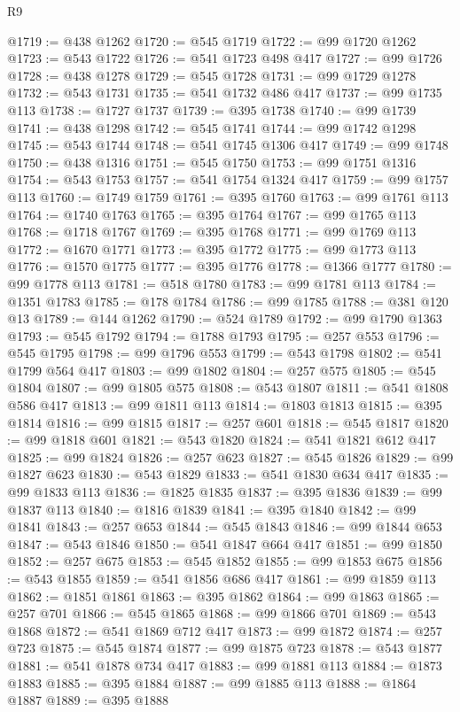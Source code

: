 \begin{lexlean}{R9}
\begin{coremodule}
@1719 := @438 @1262
@1720 := @545 @1719
@1722 := @99 @1720 @1262
@1723 := @543 @1722
@1726 := @541 @1723 @498 @417
@1727 := @99 @1726
@1728 := @438 @1278
@1729 := @545 @1728
@1731 := @99 @1729 @1278
@1732 := @543 @1731
@1735 := @541 @1732 @486 @417
@1737 := @99 @1735 @113
@1738 := @1727 @1737
@1739 := @395 @1738
@1740 := @99 @1739
@1741 := @438 @1298
@1742 := @545 @1741
@1744 := @99 @1742 @1298
@1745 := @543 @1744
@1748 := @541 @1745 @1306 @417
@1749 := @99 @1748
@1750 := @438 @1316
@1751 := @545 @1750
@1753 := @99 @1751 @1316
@1754 := @543 @1753
@1757 := @541 @1754 @1324 @417
@1759 := @99 @1757 @113
@1760 := @1749 @1759
@1761 := @395 @1760
@1763 := @99 @1761 @113
@1764 := @1740 @1763
@1765 := @395 @1764
@1767 := @99 @1765 @113
@1768 := @1718 @1767
@1769 := @395 @1768
@1771 := @99 @1769 @113
@1772 := @1670 @1771
@1773 := @395 @1772
@1775 := @99 @1773 @113
@1776 := @1570 @1775
@1777 := @395 @1776
@1778 := @1366 @1777
@1780 := @99 @1778 @113
@1781 := @518 @1780
@1783 := @99 @1781 @113
@1784 := @1351 @1783
@1785 := @178 @1784
@1786 := @99 @1785
@1788 := @381 @120 @13
@1789 := @144 @1262
@1790 := @524 @1789
@1792 := @99 @1790 @1363
@1793 := @545 @1792
@1794 := @1788 @1793
@1795 := @257 @553
@1796 := @545 @1795
@1798 := @99 @1796 @553
@1799 := @543 @1798
@1802 := @541 @1799 @564 @417
@1803 := @99 @1802
@1804 := @257 @575
@1805 := @545 @1804
@1807 := @99 @1805 @575
@1808 := @543 @1807
@1811 := @541 @1808 @586 @417
@1813 := @99 @1811 @113
@1814 := @1803 @1813
@1815 := @395 @1814
@1816 := @99 @1815
@1817 := @257 @601
@1818 := @545 @1817
@1820 := @99 @1818 @601
@1821 := @543 @1820
@1824 := @541 @1821 @612 @417
@1825 := @99 @1824
@1826 := @257 @623
@1827 := @545 @1826
@1829 := @99 @1827 @623
@1830 := @543 @1829
@1833 := @541 @1830 @634 @417
@1835 := @99 @1833 @113
@1836 := @1825 @1835
@1837 := @395 @1836
@1839 := @99 @1837 @113
@1840 := @1816 @1839
@1841 := @395 @1840
@1842 := @99 @1841
@1843 := @257 @653
@1844 := @545 @1843
@1846 := @99 @1844 @653
@1847 := @543 @1846
@1850 := @541 @1847 @664 @417
@1851 := @99 @1850
@1852 := @257 @675
@1853 := @545 @1852
@1855 := @99 @1853 @675
@1856 := @543 @1855
@1859 := @541 @1856 @686 @417
@1861 := @99 @1859 @113
@1862 := @1851 @1861
@1863 := @395 @1862
@1864 := @99 @1863
@1865 := @257 @701
@1866 := @545 @1865
@1868 := @99 @1866 @701
@1869 := @543 @1868
@1872 := @541 @1869 @712 @417
@1873 := @99 @1872
@1874 := @257 @723
@1875 := @545 @1874
@1877 := @99 @1875 @723
@1878 := @543 @1877
@1881 := @541 @1878 @734 @417
@1883 := @99 @1881 @113
@1884 := @1873 @1883
@1885 := @395 @1884
@1887 := @99 @1885 @113
@1888 := @1864 @1887
@1889 := @395 @1888

\end{coremodule}
\end{lexlean}
